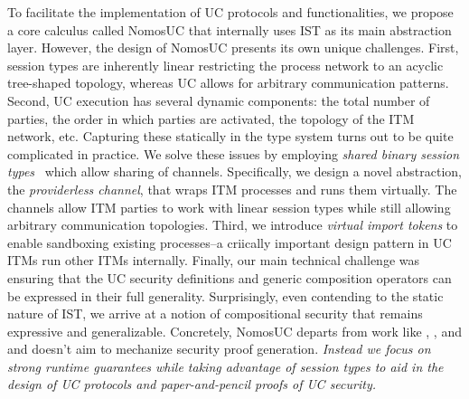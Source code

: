 To facilitate the implementation of UC protocols and functionalities, we propose a core calculus called NomosUC that
internally uses IST as its main abstraction layer.
However, the design of NomosUC presents its own unique challenges.
First, session types are inherently linear restricting the process network to an acyclic tree-shaped topology,
whereas UC allows for arbitrary communication patterns.
Second, UC execution has several dynamic components: the total number of parties, the order in which parties are activated,
the topology of the ITM network, etc.
Capturing these statically in the type system turns out to be quite complicated in practice.
We solve these issues by employing \emph{shared binary session types}~\cite{balzer2017manifest} which allow sharing
of channels. 
Specifically, we design a novel abstraction, the \emph{providerless channel}, that wraps ITM processes and runs them virtually.
The channels allow ITM parties to work with linear session types while still allowing arbitrary communication topologies.
Third, we introduce \emph{virtual import tokens} to enable sandboxing existing processes--a criically important design pattern in UC ITMs run other ITMs internally.
Finally, our main technical challenge was ensuring that the UC security definitions and generic composition operators
can be expressed in their full generality.
Surprisingly, even contending to the static nature of IST, we arrive at a notion of compositional security that remains expressive and generalizable.
Concretely, NomosUC departs from work like \cite{easyuc}, \cite{barbosa}, and \cite{ipdl} and doesn't aim to mechanize security proof generation.
\emph{Instead we focus on strong runtime guarantees while taking advantage of session types to aid in the design of UC protocols and paper-and-pencil proofs of UC security.}

